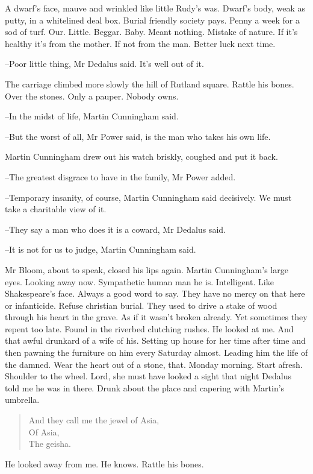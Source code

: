 A dwarf's face, mauve and wrinkled like little Rudy's was.
Dwarf's body, weak as putty, in a whitelined deal box.
Burial friendly society pays.
Penny a week for a sod of turf.
Our.
Little.
Beggar.
Baby.
Meant nothing.
Mistake of nature.
If it's healthy it's from the mother.
If not from the man.
Better luck next time.

--Poor little thing,
Mr Dedalus said.
It's well out of it.

The carriage climbed more slowly the hill of Rutland square.
Rattle his bones.
Over the stones.
Only a pauper.
Nobody owns.

--In the midst of life,
Martin Cunningham said.

--But the worst of all,
Mr Power said,
is the man who takes his own life.

Martin Cunningham drew out his watch briskly,
coughed and put it back.

--The greatest disgrace to have in the family,
Mr Power added.

--Temporary insanity, of course,
Martin Cunningham said decisively.
We must take a charitable view of it.

--They say a man who does it is a coward,
Mr Dedalus said.

--It is not for us to judge,
Martin Cunningham said.

Mr Bloom, about to speak, closed his lips again.
Martin Cunningham's large eyes.
Looking away now.
Sympathetic human man he is.
Intelligent.
Like Shakespeare's face.
Always a good word to say.
They have no mercy on that here or infanticide.
Refuse christian burial.
They used to drive a stake of wood through his heart in the grave.
As if it wasn't broken already.
Yet sometimes they repent too late.
Found in the riverbed clutching rushes.
He looked at me.
And that awful drunkard of a wife of his.
Setting up house for her time after time
and then pawning the furniture on him every Saturday almost.
Leading him the life of the damned.
Wear the heart out of a stone, that.
Monday morning.
Start afresh.
Shoulder to the wheel.
Lord, she must have looked a sight that night Dedalus told me he was in there.
Drunk about the place and capering with Martin's umbrella.


\begin{verse}
    And they call me the jewel of Asia, \\
    Of Asia, \\
    The geisha.
\end{verse}


He looked away from me.
He knows.
Rattle his bones.

